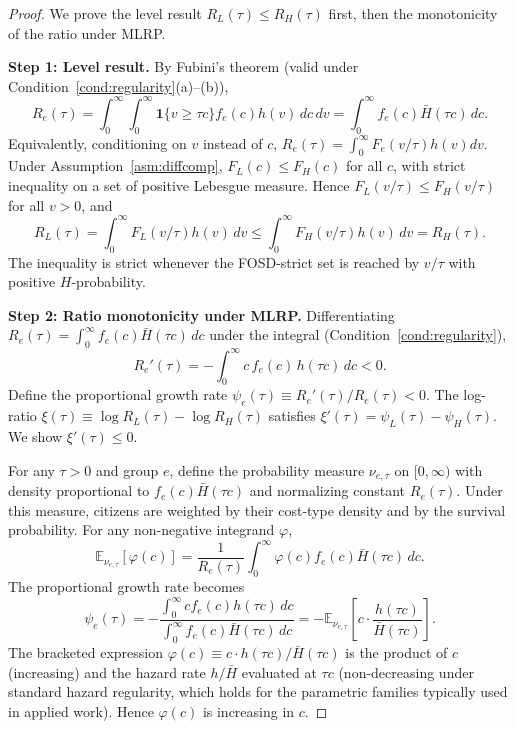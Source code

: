 \begin{proof}
We prove the level result $R_L(\tau) \leq R_H(\tau)$ first, then the monotonicity of the ratio under MLRP.

\textbf{Step 1: Level result.} By Fubini's theorem (valid under Condition~\ref{cond:regularity}(a)--(b)),
\[
R_e(\tau) = \int_0^\infty \int_0^\infty \mathbf{1}\{v \geq \tau c\} f_e(c) h(v) \, dc \, dv = \int_0^\infty f_e(c) \bar H(\tau c) \, dc.
\]
Equivalently, conditioning on $v$ instead of $c$, $R_e(\tau) = \int_0^\infty F_e(v/\tau) h(v) dv$. Under Assumption~\ref{asm:diffcomp}, $F_L(c) \leq F_H(c)$ for all $c$, with strict inequality on a set of positive Lebesgue measure. Hence $F_L(v/\tau) \leq F_H(v/\tau)$ for all $v > 0$, and
\[
R_L(\tau) = \int_0^\infty F_L(v/\tau) h(v) \, dv \leq \int_0^\infty F_H(v/\tau) h(v) \, dv = R_H(\tau).
\]
The inequality is strict whenever the FOSD-strict set is reached by $v/\tau$ with positive $H$-probability.

\textbf{Step 2: Ratio monotonicity under MLRP.} Differentiating $R_e(\tau) = \int_0^\infty f_e(c) \bar H(\tau c) \, dc$ under the integral (Condition~\ref{cond:regularity}),
\begin{equation}
R_e'(\tau) = -\int_0^\infty c \, f_e(c) \, h(\tau c) \, dc < 0.
\label{eq:Re_deriv}
\end{equation}
Define the proportional growth rate $\psi_e(\tau) \equiv R_e'(\tau)/R_e(\tau) < 0$. The log-ratio $\xi(\tau) \equiv \log R_L(\tau) - \log R_H(\tau)$ satisfies $\xi'(\tau) = \psi_L(\tau) - \psi_H(\tau)$. We show $\xi'(\tau) \leq 0$.

For any $\tau > 0$ and group $e$, define the probability measure $\nu_{e,\tau}$ on $[0, \infty)$ with density proportional to $f_e(c) \bar H(\tau c)$ and normalizing constant $R_e(\tau)$. Under this measure, citizens are weighted by their cost-type density and by the survival probability. For any non-negative integrand $\varphi$,
\[
\mathbb{E}_{\nu_{e,\tau}}[\varphi(c)] = \frac{1}{R_e(\tau)} \int_0^\infty \varphi(c) f_e(c) \bar H(\tau c) \, dc.
\]
The proportional growth rate becomes
\[
\psi_e(\tau) = -\frac{\int_0^\infty c f_e(c) h(\tau c) \, dc}{\int_0^\infty f_e(c) \bar H(\tau c) \, dc} = -\mathbb{E}_{\nu_{e,\tau}}\!\left[ c \cdot \frac{h(\tau c)}{\bar H(\tau c)} \right].
\]
The bracketed expression $\varphi(c) \equiv c \cdot h(\tau c) / \bar H(\tau c)$ is the product of $c$ (increasing) and the hazard rate $h/\bar H$ evaluated at $\tau c$ (non-decreasing under standard hazard regularity, which holds for the parametric families typically used in applied work). Hence $\varphi(c)$ is increasing in $c$.


\end{proof}
